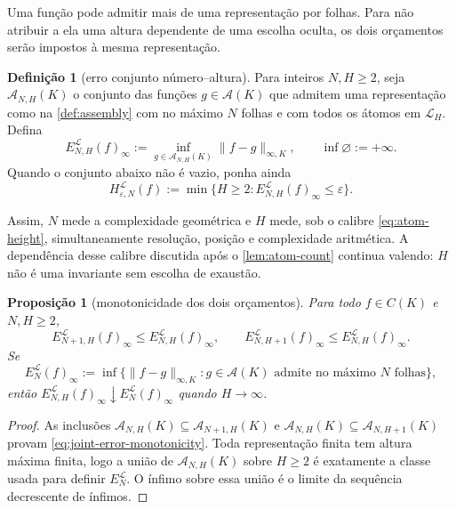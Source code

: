 \documentclass[11pt,a4paper]{article}
\newtheorem{proposition}[theorem]{Proposição}
\theoremstyle{definition}
\newtheorem{definition}[theorem]{Definição}
\theoremstyle{remark}
\newcommand{\Aclass}{\mathcal{A}}
\newcommand{\Library}{\mathcal{L}}
\begin{document}
Uma função pode admitir mais de uma representação por folhas. Para não
atribuir a ela uma altura dependente de uma escolha oculta, os dois
orçamentos serão impostos à mesma representação.

\begin{definition}[erro conjunto número--altura]
\label{def:joint-error}
Para inteiros $N,H\ge2$, seja $\Aclass_{N,H}(K)$ o conjunto das funções
$g\in\Aclass(K)$ que admitem uma representação como na
\cref{def:assembly} com no máximo $N$ folhas e com todos os átomos em
$\Library_H$. Defina
\begin{equation}
 E_{N,H}^{\Library}(f)_\infty
 :=\inf_{g\in\Aclass_{N,H}(K)}\|f-g\|_{\infty,K},
 \qquad \inf\varnothing:=+\infty.
 \label{eq:joint-error}
\end{equation}
Quando o conjunto abaixo não é vazio, ponha ainda
\begin{equation}
 H_{\varepsilon,N}^{\Library}(f)
 :=\min\{H\ge2:E_{N,H}^{\Library}(f)_\infty\le\varepsilon\}.
 \label{eq:height-for-accuracy}
\end{equation}
\end{definition}

Assim, $N$ mede a complexidade geométrica e $H$ mede, sob o calibre
\eqref{eq:atom-height}, simultaneamente resolução, posição e complexidade
aritmética. A dependência desse calibre discutida após o
\cref{lem:atom-count} continua valendo: $H$ não é uma invariante sem escolha
de exaustão.

\begin{proposition}[monotonicidade dos dois orçamentos]
\label{prop:joint-error-monotonicity}
Para todo $f\in C(K)$ e $N,H\ge2$,
\begin{equation}
 E_{N+1,H}^{\Library}(f)_\infty\le E_{N,H}^{\Library}(f)_\infty,
 \qquad
 E_{N,H+1}^{\Library}(f)_\infty\le E_{N,H}^{\Library}(f)_\infty.
 \label{eq:joint-error-monotonicity}
\end{equation}
Se
\[
 E_N^{\Library}(f)_\infty
 :=\inf\{\|f-g\|_{\infty,K}:g\in\Aclass(K)
       \text{ admite no máximo $N$ folhas}\},
\]
então $E_{N,H}^{\Library}(f)_\infty\downarrow
E_N^{\Library}(f)_\infty$ quando $H\to\infty$.
\end{proposition}

\begin{proof}
As inclusões
$\Aclass_{N,H}(K)\subseteq\Aclass_{N+1,H}(K)$ e
$\Aclass_{N,H}(K)\subseteq\Aclass_{N,H+1}(K)$ provam
\eqref{eq:joint-error-monotonicity}. Toda representação finita tem altura
máxima finita, logo a união de $\Aclass_{N,H}(K)$ sobre $H\ge2$ é exatamente
a classe usada para definir $E_N^{\Library}$. O ínfimo sobre essa união é o
limite da sequência decrescente de ínfimos.
\end{proof}
\end{document}
